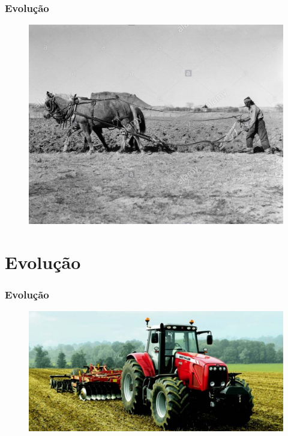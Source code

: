 \documentclass{beamer}
\begin{document}
\begin{frame}
\frametitle{Evolução}

\begin{figure}[!htb]
\centering
\includegraphics[scale=0.25]{imgs/arado1900.jpg}
\label{Rotulo}
\end{figure}


\end{frame}
\section[]{Evolução}

\begin{frame}
\frametitle{Evolução}

\begin{figure}[!htb]
\centering
\includegraphics[scale=0.25]{imgs/tratoratual.jpg}
\label{Rotulo}
\end{figure}


\end{frame}
\end{document}
